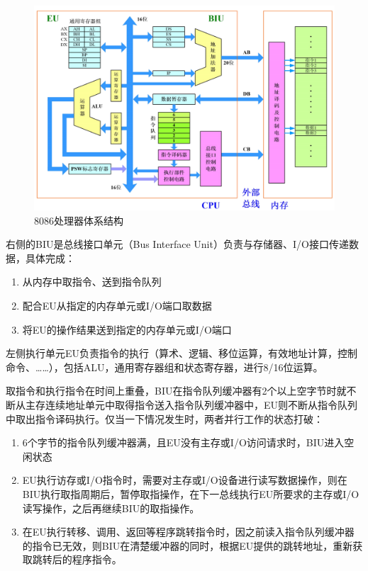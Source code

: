 \documentclass{article}
\begin{document}
\begin{figure}[H]
    \centering
    \includegraphics[width = 14cm]{img/2.1-1.png}
    \caption{8086处理器体系结构}
\end{figure}

右侧的BIU是总线接口单元（Bus Interface Unit）负责与存储器、I/O接口传递数据，具体完成：
\begin{enumerate}
    \item 从内存中取指令、送到指令队列
    \item 配合EU从指定的内存单元或I/O端口取数据
    \item 将EU的操作结果送到指定的内存单元或I/O端口
\end{enumerate}

左侧执行单元EU负责指令的执行（算术、逻辑、移位运算，有效地址计算，控制命令、……），包括ALU，通用寄存器组和状态寄存器，进行8/16位运算。


取指令和执行指令在时间上重叠，BIU在指令队列缓冲器有2个以上空字节时就不断从主存连续地址单元中取得指令送入指令队列缓冲器中，EU则不断从指令队列中取出指令译码执行。仅当一下情况发生时，两者并行工作的状态打破：
\begin{enumerate}
    \item 6个字节的指令队列缓冲器满，且EU没有主存或I/O访问请求时，BIU进入空闲状态
    \item EU执行访存或I/O指令时，需要对主存或I/O设备进行读写数据操作，则在BIU执行取指周期后，暂停取指操作，在下一总线执行EU所要求的主存或I/O读写操作，之后再继续BIU的取指操作。
    \item 在EU执行转移、调用、返回等程序跳转指令时，因之前读入指令队列缓冲器的指令已无效，则BIU在清楚缓冲器的同时，根据EU提供的跳转地址，重新获取跳转后的程序指令。
\end{enumerate}
\end{document}
